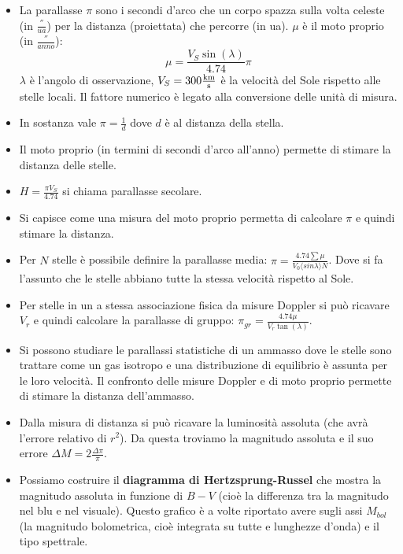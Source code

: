 \documentclass[11pt,a4paper]{article}
\begin{document}
\begin{itemize}
\item La parallasse $\pi$ sono i secondi d'arco che un corpo spazza sulla volta celeste (in $\frac{''}{ua}$) per la distanza (proiettata) che percorre (in ua). $\mu$ è il moto proprio (in $\frac{''}{anno}$):
\begin{equation}
\mu = \frac{V_S \sin (\lambda)}{4.74} \pi
\end{equation}
$\lambda$ è l'angolo di osservazione, $V_S = 300 \si{\frac{\kilo \meter}{\s}}$ è la velocità del Sole rispetto alle stelle locali. Il fattore numerico è legato alla conversione delle unità di misura.

\item In sostanza vale $\pi = \frac{1}{d}$ dove $d$ è al distanza della stella.

\item Il moto proprio (in termini di secondi d'arco all'anno) permette di stimare la distanza delle stelle.

\item $H = \frac{\pi V_S}{4.74}$ si chiama parallasse secolare.

\item Si capisce come una misura del moto proprio permetta di calcolare $\pi$ e quindi stimare la distanza.

\item Per $N$ stelle è possibile definire la parallasse media: $\pi = \frac{4.74 \sum \mu}{V_0 \langle sin \lambda \rangle N}$. Dove si fa l'assunto che le stelle abbiano tutte la stessa velocità rispetto al Sole.

\item Per stelle in un a stessa associazione fisica da misure Doppler si può ricavare $V_r$ e quindi calcolare  la parallasse di gruppo: $\pi_{gr} = \frac{4.74 \mu}{V_r \tan (\lambda) }$.

\item Si possono studiare le parallassi statistiche di un ammasso dove le stelle sono trattare come un gas isotropo e una distribuzione di equilibrio è assunta per le loro velocità. Il confronto delle misure Doppler e di moto proprio permette di stimare la distanza dell'ammasso.

\item Dalla misura di distanza si può ricavare la luminosità assoluta (che avrà l'errore relativo di $r^2$). Da questa troviamo la magnitudo assoluta e il suo errore $\Delta M = 2 \frac{\Delta \pi}{\pi}$.

\item Possiamo costruire il \textbf{diagramma di Hertzsprung-Russel} che mostra la magnitudo assoluta in funzione di $B-V$ (cioè la differenza tra la magnitudo nel blu e nel visuale). Questo grafico è a volte riportato avere sugli assi $M_{bol}$ (la magnitudo bolometrica, cioè integrata su tutte e lunghezze d'onda) e il tipo spettrale.


\end{itemize}
\end{document}
